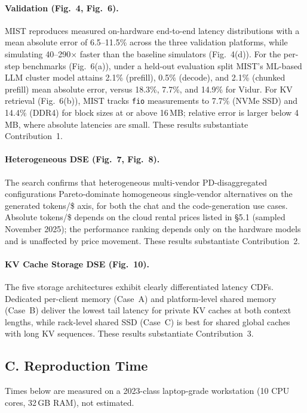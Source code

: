 \documentclass[conference]{IEEEtran}
\newcommand{\tool}{{MIST }}
\newcommand{\toolns}{{MIST}}
\begin{document}
\paragraph{Validation (Fig.~4, Fig.~6).}
\tool reproduces measured on-hardware end-to-end latency distributions
with a mean absolute error of 6.5--11.5\% across the three validation
platforms, while simulating 40--290$\times$ faster than the baseline
simulators (Fig.~4(d)).
For the per-step benchmarks (Fig.~6(a)), under a held-out evaluation
split \toolns's ML-based LLM cluster model attains 2.1\% (prefill),
0.5\% (decode), and 2.1\% (chunked prefill) mean absolute error, versus
18.3\%, 7.7\%, and 14.9\% for Vidur.
For KV retrieval (Fig.~6(b)), \tool tracks \texttt{fio} measurements to
7.7\% (NVMe SSD) and 14.4\% (DDR4) for block sizes at or above 16\,MB;
relative error is larger below 4\,MB, where absolute latencies are small.
These results substantiate Contribution~1.

\paragraph{Heterogeneous DSE (Fig.~7, Fig.~8).}
The search confirms that heterogeneous multi-vendor PD-disaggregated
configurations Pareto-dominate homogeneous single-vendor alternatives on
the generated tokens/\$ axis, for both the chat and the code-generation
use cases.
Absolute tokens/\$ depends on the cloud rental prices listed in \S5.1
(sampled November 2025); the performance ranking depends only on the
hardware models and is unaffected by price movement.
These results substantiate Contribution~2.

\paragraph{KV Cache Storage DSE (Fig.~10).}
The five storage architectures exhibit clearly differentiated latency
CDFs.  Dedicated per-client memory (Case~A) and platform-level shared
memory (Case~B) deliver the lowest tail latency for private KV caches at
both context lengths, while rack-level shared SSD (Case~C) is best for
shared global caches with long KV sequences.
These results substantiate Contribution~3.

\subsection*{C. Reproduction Time}

Times below are measured on a 2023-class laptop-grade workstation
(10 CPU cores, 32\,GB RAM), not estimated.
\end{document}
